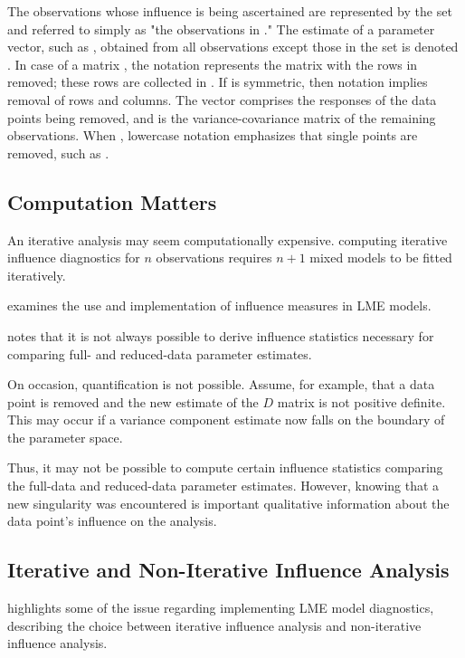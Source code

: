 \documentclass[12pt, a4paper]{report}
\theoremstyle{plain}
\theoremstyle{definition}
\theoremstyle{remark}
\begin{document}
The observations whose influence is being ascertained are represented by the set  and referred to simply as "the observations in ." The estimate of a parameter vector, such as , obtained from all observations except those in the set  is denoted . In case of a matrix , the notation  represents the matrix with the rows in  removed; these rows are collected in .
If  is symmetric, then notation  implies removal of rows and columns. The vector  comprises the responses of the data points being removed, and  is the variance-covariance matrix of the remaining observations. When , lowercase notation emphasizes that single points are removed, such as .



\subsection{Computation Matters}

An iterative analysis may seem computationally expensive. computing iterative influence diagnostics for $n$ observations
requires $n+1$ mixed models to be fitted iteratively.


\citet{schabenberger} examines the use and implementation of
influence measures in LME models.

\citet{schabenberger} notes that it is not always possible to
derive influence statistics necessary for comparing full- and
reduced-data parameter estimates.


On occasion, quantification is not possible. Assume, for example, that a data point is removed
and the new estimate of the $D$ matrix is not positive definite. This may occur if a variance component
estimate now falls on the boundary of the parameter space. 

Thus, it may not be possible to compute certain
influence statistics comparing the full-data and reduced-data parameter estimates. However, knowing that
a new singularity was encountered is important qualitative information about the data point’s influence on
the analysis.


\subsection{Iterative and Non-Iterative Influence Analysis}
\citet{schabenberger} highlights some of the issue regarding implementing LME model diagnostics, describing  the choice between  iterative influence analysis and  non-iterative influence analysis.
\end{document}

